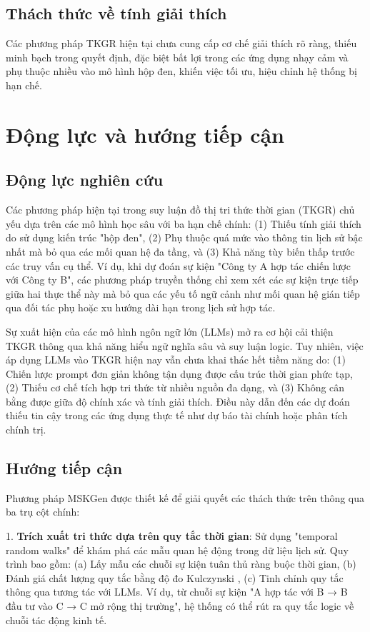 \subsection{Thách thức về tính giải thích}
Các phương pháp TKGR hiện tại chưa cung cấp cơ chế giải thích rõ ràng, thiếu minh bạch trong quyết định, đặc biệt bất lợi trong các ứng dụng nhạy cảm và phụ thuộc nhiều vào mô hình hộp đen, khiến việc tối ưu, hiệu chỉnh hệ thống bị hạn chế.


\section{Động lực và hướng tiếp cận}

\subsection{Động lực nghiên cứu}
Các phương pháp hiện tại trong suy luận đồ thị tri thức thời gian (TKGR) chủ yếu dựa trên các mô hình học sâu với ba hạn chế chính: (1) Thiếu tính giải thích do sử dụng kiến trúc "hộp đen", (2) Phụ thuộc quá mức vào thông tin lịch sử bậc nhất mà bỏ qua các mối quan hệ đa tầng, và (3) Khả năng tùy biến thấp trước các truy vấn cụ thể. Ví dụ, khi dự đoán sự kiện "Công ty A hợp tác chiến lược với Công ty B", các phương pháp truyền thống chỉ xem xét các sự kiện trực tiếp giữa hai thực thể này mà bỏ qua các yếu tố ngữ cảnh như mối quan hệ gián tiếp qua đối tác phụ hoặc xu hướng dài hạn trong lịch sử hợp tác.

Sự xuất hiện của các mô hình ngôn ngữ lớn (LLMs) mở ra cơ hội cải thiện TKGR thông qua khả năng hiểu ngữ nghĩa sâu và suy luận logic. Tuy nhiên, việc áp dụng LLMs vào TKGR hiện nay vẫn chưa khai thác hết tiềm năng do: (1) Chiến lược prompt đơn giản không tận dụng được cấu trúc thời gian phức tạp, (2) Thiếu cơ chế tích hợp tri thức từ nhiều nguồn đa dạng, và (3) Không cân bằng được giữa độ chính xác và tính giải thích. Điều này dẫn đến các dự đoán thiếu tin cậy trong các ứng dụng thực tế như dự báo tài chính hoặc phân tích chính trị.

\subsection{Hướng tiếp cận}
Phương pháp MSKGen được thiết kế để giải quyết các thách thức trên thông qua ba trụ cột chính:

1. \textbf{Trích xuất tri thức dựa trên quy tắc thời gian}: Sử dụng "temporal random walks" \cite{ref_article28} để khám phá các mẫu quan hệ động trong dữ liệu lịch sử. Quy trình bao gồm: (a) Lấy mẫu các chuỗi sự kiện tuân thủ ràng buộc thời gian, (b) Đánh giá chất lượng quy tắc bằng độ đo Kulczynski \cite{ref_article16}, (c) Tinh chỉnh quy tắc thông qua tương tác với LLMs. Ví dụ, từ chuỗi sự kiện "A hợp tác với B → B đầu tư vào C → C mở rộng thị trường", hệ thống có thể rút ra quy tắc logic về chuỗi tác động kinh tế.

